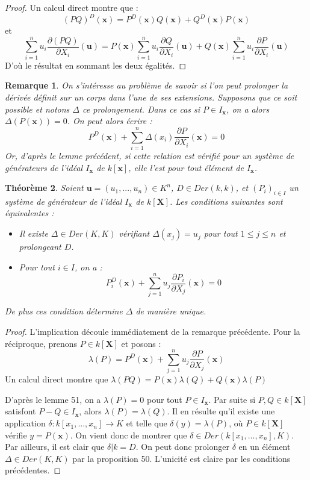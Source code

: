 \documentclass[12pt,a4paper]{report}
\newtheorem{thm}{\bf Th\'eor\`eme}
\newtheorem{rem}[thm]{Remarque}
\begin{document}
\begin{proof}
Un calcul direct montre que :
$$(PQ)^D(\textbf{x})=P^D(\textbf{x})Q(\textbf{x})+Q^D(\textbf{x})P(\textbf{x})$$
et
$$\sum_{i=1}^{n}u_i\dfrac{\partial (PQ)}{\partial X_i}(\textbf{u})=P(\textbf{x})\sum_{i=1}^{n}u_i\dfrac{\partial Q}{\partial X_i}(\textbf{u})+Q(\textbf{x})\sum_{i=1}^{n}u_i\dfrac{\partial P}{\partial X_i}(\textbf{u})$$
D'où le résultat en sommant les deux égalités. 
\end{proof}

\begin{rem}\rm
On s'intéresse au problème de savoir si l'on peut prolonger la dérivée définit sur un corps dans l'une de ses extensions. Supposons que ce soit possible et notons $\Delta$ ce prolongement. Dans ce cas si $P\in I_{\textbf{x}}$, on a alors $\Delta(P(\textbf{x}))=0$. On peut alors écrire : 
$$P^D(\textbf{x})+\sum_{i=1}^{n}\Delta(x_i) \dfrac{\partial P}{\partial X_i}(\textbf{x})=0$$
Or, d'après le lemme précédent, si cette relation est vérifié pour un système de générateurs de l'idéal $I_{\textbf{x}}$ de $k[\textbf{x}]$, elle l'est pour tout élément de $I_{\textbf{x}}$.
\end{rem}

\begin{thm}\rm
Soient $\textbf{u}=(u_1,...,u_n)\in K^n$, $D\in Der(k,k)$, et $(P_i)_{i\in I}$ un système de générateur de l'idéal $I_{\textbf{x}}$ de $k[\textbf{X}]$. Les conditions suivantes sont équivalentes : 
\begin{itemize}
\item Il existe $\Delta \in Der(K,K)$ vérifiant $\Delta(x_j)=u_j$ pour tout $1\leq j\leq n$ et prolongeant $D$. 
\item Pour tout $i\in I$, on a : 
$$P^D_i(\textbf{x})+\sum_{j=1}^{n}u_j\dfrac{\partial P_i}{\partial X_j}(\textbf{x})=0$$
\end{itemize}
De plus ces condition détermine $\Delta$ de manière unique.
\end{thm}

\begin{proof}
L'implication découle immédiatement de la remarque précédente. Pour la réciproque, prenons $P\in k[\textbf{X}]$ et posons : 
$$\lambda(P)=P^D(\textbf{x})+\sum_{j=1}^{n}u_j\dfrac{\partial P}{\partial X_j}(\textbf{x})$$
Un calcul direct montre que $\lambda(PQ)=P(\textbf{x})\lambda(Q)+Q(\textbf{x})\lambda(P)$

D'après le lemme 51, on a $\lambda(P)=0$ pour tout $P\in I_{\textbf{x}}$. Par suite si $P,Q \in k[\textbf{X}]$ satisfont $P-Q \in I_{\textbf{x}}$, alors $\lambda(P)=\lambda(Q)$. Il en résulte qu'il existe une application $\delta : k[x_1,...,x_n] \rightarrow K$ et telle que $\delta(y)=\lambda(P)$, où $P\in k[\textbf{X}]$ vérifie $y=P(\textbf{x})$. On vient donc de montrer que $\delta \in Der(k[x_1,...,x_n],K)$. Par ailleurs, il est clair que $\delta|k=D$. On peut donc prolonger $\delta$ en un élément $\Delta \in Der(K,K)$ par la proposition 50. L'unicité est claire par les conditions précédentes.  
\end{proof}
\end{document}

